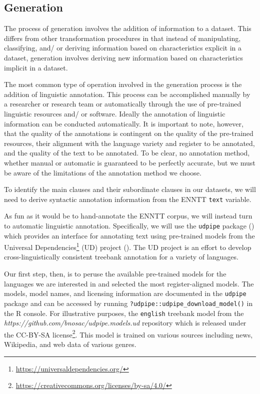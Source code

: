 \documentclass[
  letterpaper,
  DIV=11,
  numbers=noendperiod]{scrreprt}
\theoremstyle{definition}
\theoremstyle{remark}
\DeclareRobustCommand{\href}[2]{#2\footnote{\url{#1}}}
\begin{document}
\subsection{Generation}\label{sec-td-generation}

The process of generation involves the addition of information to a
dataset. This differs from other transformation procedures in that
instead of manipulating, classifying, and/ or deriving information based
on characteristics explicit in a dataset, generation involves deriving
new information based on characteristics implicit in a dataset.

The most common type of operation involved in the generation process is
the addition of linguistic annotation. This process can be accomplished
manually by a researcher or research team or automatically through the
use of pre-trained linguistic resources and/ or software. Ideally the
annotation of linguistic information can be conducted automatically. It
is important to note, however, that the quality of the annotations is
contingent on the quality of the pre-trained resources, their alignment
with the language variety and register to be annotated, and the quality
of the text to be annotated. To be clear, no annotation method, whether
manual or automatic is guaranteed to be perfectly accurate, but we must
be aware of the limitations of the annotation method we choose.

To identify the main clauses and their subordinate clauses in our
datasets, we will need to derive syntactic annotation information from
the ENNTT \texttt{text} variable.

As fun as it would be to hand-annotate the ENNTT corpus, we will instead
turn to automatic linguistic annotation. Specifically, we will use the
\texttt{udpipe} package () which
provides an interface for annotating text using pre-trained models from
the \href{https://universaldependencies.org/}{Universal Dependencies}
(UD) project (). The UD
project is an effort to develop cross-linguistically consistent treebank
annotation for a variety of languages.

Our first step, then, is to peruse the available pre-trained models for
the languages we are interested in and selected the most
register-aligned models. The models, model names, and licensing
information are documented in the \texttt{udpipe} package and can be
accessed by running \texttt{?udpipe::udpipe\_download\_model()} in the R
console. For illustrative purposes, the \texttt{english} treebank model
from the \emph{https://github.com/bnosac/udpipe.models.ud} repository
which is released under the
\href{https://creativecommons.org/licenses/by-sa/4.0/}{CC-BY-SA
license}. This model is trained on various sources including news,
Wikipedia, and web data of various genres.
\end{document}
